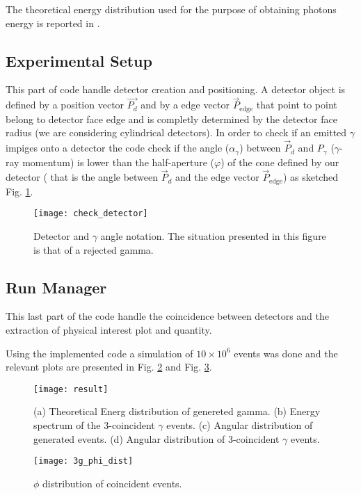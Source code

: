 The theoretical energy distribution used for the purpose of obtaining photons energy is reported in \cite{ore1949three}.

\subsection*{Experimental Setup}

This part of code handle detector creation and positioning. A detector object is defined by a position vector $\vec{P_d}$ and by a edge vector $\vec{P}_{\text{edge}}$ that point to point belong to detector face edge and is completly determined by the detector face radius (we are considering cylindrical detectors). In order to check if an emitted $\gamma$ impiges onto a detector the code check if the angle ($\alpha_\gamma$) between $\vec{P}_d$ and $P_\gamma$ ($\gamma$-ray momentum) is lower than the half-aperture ($\varphi$) of the cone defined by our detector ( that is the angle between $\vec{P}_d$ and the edge vector $\vec{P}_{\text{edge}}$) as sketched Fig. \ref{Fig: angle det check}.

\begin{figure}[H]
\centering
\texttt{[image: check\_detector]}
\caption{Detector and $\gamma$ angle notation. The situation presented in this figure is that of a rejected gamma.}
\label{Fig: angle det check}
\end{figure}


\subsection*{Run Manager}

This last part of the code handle the coincidence between detectors and the extraction of physical interest plot and quantity.

Using the implemented code a simulation of $10\times 10^6$ events was done and the relevant plots are presented in Fig. \ref{Fig: simulation result} and Fig. \ref{Fig: simulation phi dist}.

\begin{figure}[H]
\centering
\texttt{[image: result]}
\caption{(a) Theoretical Energ distribution of genereted gamma. (b) Energy spectrum of the 3-coincident $\gamma$ events. (c) Angular distribution of generated events. (d) Angular distribution of 3-coincident $\gamma$ events.}
\label{Fig: simulation result}
\end{figure}
\begin{figure}[H]
\centering
\texttt{[image: 3g\_phi\_dist]}
\caption{$\phi$ distribution of coincident events.}
\label{Fig: simulation phi dist}
\end{figure}
